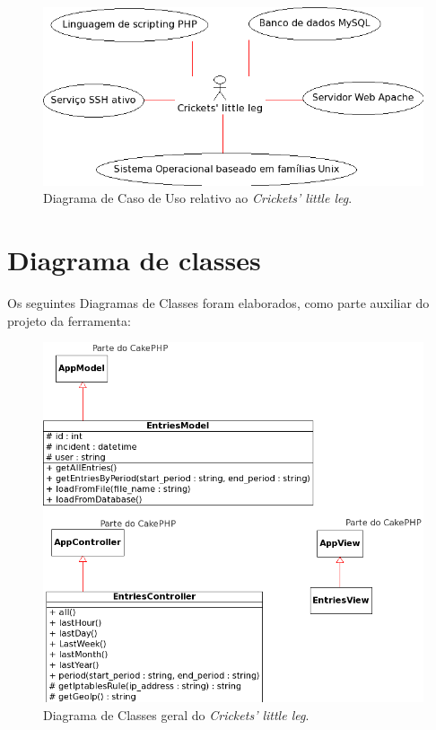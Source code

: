 \vspace{2.5 cm}

\begin{figure}[hb]
    \begin{center}
        \includegraphics[scale=0.8]{./figuras/casoUsoCLL.png}

        \caption{Diagrama de Caso de Uso relativo ao \textit{Crickets' little leg}.}
    \end{center}
\end{figure}

\clearpage
\section{Diagrama de classes}

Os seguintes Diagramas de Classes foram elaborados, como parte auxiliar do projeto da ferramenta:

\begin{figure}[hc]
    \begin{center}
        \includegraphics[scale=0.8]{./figuras/diagramaDeClasses.png}

        \caption{Diagrama de Classes geral do \textit{Crickets' little leg}.}
    \end{center}
\end{figure}

